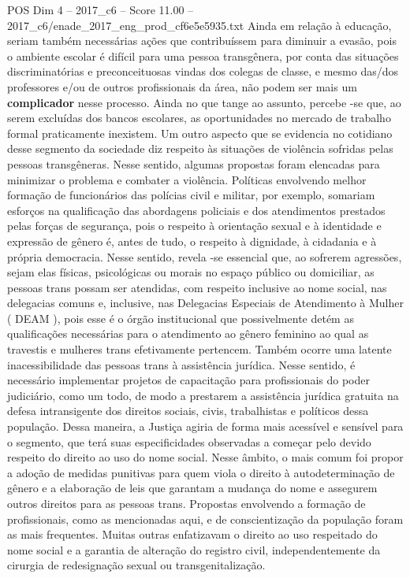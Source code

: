 \begin{textsample}{POS Dim 4 – 2017\_c6 – Score 11.00 – 2017\_c6/enade\_2017\_eng\_prod\_cf6e5e5935.txt}
Ainda em relação à educação, seriam também necessárias ações que contribuíssem para diminuir a evasão, pois o ambiente escolar é difícil para uma pessoa transgênera, por conta das situações discriminatórias e preconceituosas vindas dos colegas de classe, e mesmo das/dos professores e/ou de outros profissionais da área, não podem ser mais um \textbf{complicador} nesse processo.
Ainda no que tange ao assunto, percebe -se que, ao serem excluídas dos bancos escolares, as oportunidades no mercado de trabalho formal praticamente inexistem.
Um outro aspecto que se evidencia no cotidiano desse segmento da sociedade diz respeito às situações de violência sofridas pelas pessoas transgêneras.
Nesse sentido, algumas propostas foram elencadas para minimizar o problema e combater a violência.
Políticas envolvendo melhor formação de funcionários das polícias civil e militar, por exemplo, somariam esforços na qualificação das abordagens policiais e dos atendimentos prestados pelas forças de segurança, pois o respeito à orientação sexual e à identidade e expressão de gênero é, antes de tudo, o respeito à dignidade, à cidadania e à própria democracia.
Nesse sentido, revela -se essencial que, ao sofrerem agressões, sejam elas físicas, psicológicas ou morais no espaço público ou domiciliar, as pessoas trans possam ser atendidas, com respeito inclusive ao nome social, nas delegacias comuns e, inclusive, nas Delegacias Especiais de Atendimento à Mulher ( DEAM ), pois esse é o órgão institucional que possivelmente detém as qualificações necessárias para o atendimento ao gênero feminino ao qual as travestis e mulheres trans efetivamente pertencem.
Também ocorre uma latente inacessibilidade das pessoas trans à assistência jurídica.
Nesse sentido, é necessário implementar projetos de capacitação para profissionais do poder judiciário, como um todo, de modo a prestarem a assistência jurídica gratuita na defesa intransigente dos direitos sociais, civis, trabalhistas e políticos dessa população.
Dessa maneira, a Justiça agiria de forma mais acessível e sensível para o segmento, que terá suas especificidades observadas a começar pelo devido respeito do direito ao uso do nome social.
Nesse âmbito, o mais comum foi propor a adoção de medidas punitivas para quem viola o direito à autodeterminação de gênero e a elaboração de leis que garantam a mudança do nome e assegurem outros direitos para as pessoas trans.
Propostas envolvendo a formação de profissionais, como as mencionadas aqui, e de conscientização da população foram as mais frequentes.
Muitas outras enfatizavam o direito ao uso respeitado do nome social e a garantia de alteração do registro civil, independentemente da cirurgia de redesignação sexual ou transgenitalização.

\end{textsample}
